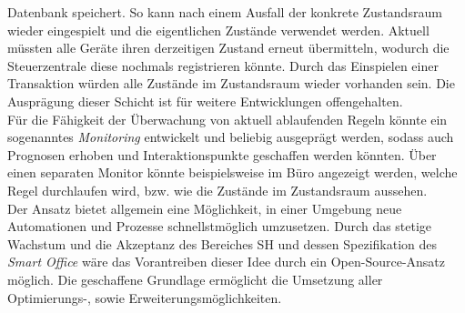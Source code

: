     Datenbank speichert. So kann nach einem Ausfall der konkrete Zustandsraum wieder eingespielt und die eigentlichen Zustände verwendet werden. Aktuell müssten alle Geräte ihren derzeitigen Zustand erneut übermitteln, wodurch 
    die Steuerzentrale diese nochmals registrieren könnte. Durch das Einspielen einer Transaktion würden alle Zustände im Zustandsraum wieder vorhanden sein. Die Ausprägung dieser Schicht ist für weitere Entwicklungen offengehalten. 
    \\
    \linebreak
    Für die Fähigkeit der Überwachung von aktuell ablaufenden Regeln könnte ein sogenanntes \textit{Monitoring} entwickelt und beliebig ausgeprägt werden, sodass auch Prognosen erhoben und Interaktionspunkte geschaffen 
    werden könnten. Über einen separaten Monitor könnte beispielsweise im Büro angezeigt werden, welche Regel durchlaufen wird, bzw. wie die Zustände im Zustandsraum aussehen. 
    \\
    \linebreak
    Der Ansatz bietet allgemein eine Möglichkeit, in einer Umgebung neue Automationen und Prozesse schnellstmöglich umzusetzen. Durch das stetige Wachstum und die Akzeptanz des Bereiches \acl{SH} und dessen Spezifikation des 
    \textit{Smart Office} wäre das Vorantreiben dieser Idee durch ein Open-Source-Ansatz möglich. Die geschaffene Grundlage ermöglicht die Umsetzung aller Optimierungs-, sowie Erweiterungsmöglichkeiten. 

